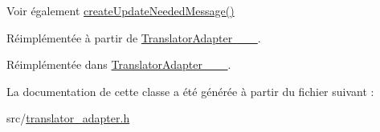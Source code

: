 \begin{DoxySeeAlso}{Voir également}
\hyperlink{class_translator_adapter_base_a71493b87a34d6e4c232e540734aba698}{create\+Update\+Needed\+Message()} 
\end{DoxySeeAlso}


Réimplémentée à partir de \hyperlink{class_translator_adapter__1__6__0_abc231eb2c1864ca9f878e7e5deb94f54}{Translator\+Adapter\+\_\+\_\+\_}.



Réimplémentée dans \hyperlink{class_translator_adapter__1__4__6_ab19b01d4e00c95ef1e6eb631fbe6ada4}{Translator\+Adapter\+\_\+\_\+\_}.



La documentation de cette classe a été générée à partir du fichier suivant \+:\begin{DoxyCompactItemize}
\item 
src/\hyperlink{translator__adapter_8h}{translator\+\_\+adapter.\+h}\end{DoxyCompactItemize}
